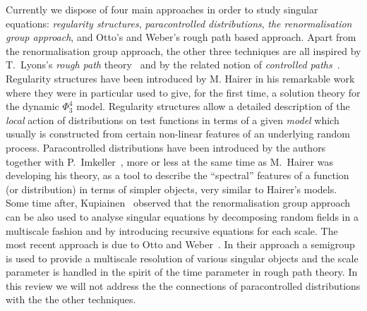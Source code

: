 \documentclass[a4paper, 11pt]{article}
\newcommand{\tmtextit}[1]{{\itshape{#1}}}
\begin{document}
Currently we dispose of four main approaches in order to study singular
equations: \tmtextit{regularity structures}, \tmtextit{paracontrolled
distributions}, \tmtextit{the renormalisation group approach}, and Otto's and Weber's rough path based approach. Apart from the renormalisation group approach, the other three techniques are all
inspired by T.~Lyons's \emph{rough path}
theory~{\cite{lyons_differential_1998,lyons_system_2002,lyons_differential_2007}} and by the related notion of \emph{controlled paths}~{\cite{gubinelli_controlling_2004,friz_course_2014}}. 
 Regularity
structures have been introduced by M. Hairer in his remarkable
work~{\cite{hairer_theory_2014}} where they were in particular used to give, for the first time, a solution theory for the dynamic $\Phi^4_3$ model. Regularity
structures allow a detailed description of the \tmtextit{local} action of
distributions on test functions in terms of a given \tmtextit{model} which
usually is constructed from certain non-linear features of an underlying
random process. Paracontrolled distributions have been introduced by the
authors together with P.~Imkeller~{\cite{gubinelli_paracontrolled_2015}}, more
or less at the same time as M.~Hairer was developing his theory, as a tool to
describe the ``spectral'' features of a function (or distribution) in terms of
simpler objects, very similar to Hairer's models. Some time after,
Kupiainen~{\cite{kupiainen_renormalization_2016-1}} observed that the
renormalisation group approach can be also used to analyse singular equations
by decomposing random fields in a multiscale fashion and by introducing
recursive equations for each scale. The most recent approach is due to Otto and Weber~\cite{otto_quasilinear_2016}. In their approach a semigroup is used to provide a multiscale resolution of various singular objects and the scale parameter is handled in the spirit of the time parameter in rough path theory. In this review we will not address the the connections of
paracontrolled distributions with the the other techniques.
\end{document}
